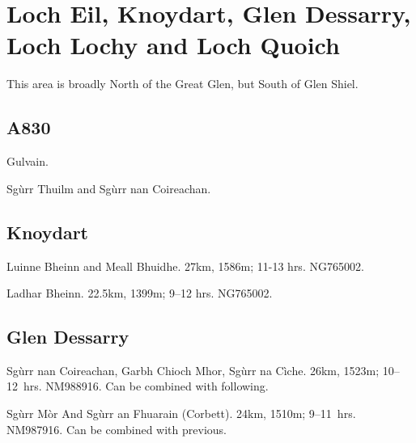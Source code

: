 \section{Loch Eil, Knoydart, Glen Dessarry, Loch Lochy and Loch Quoich}

This area is broadly North of the Great Glen, but South of Glen Shiel. 

\subsection{A830}

\begin{munros}
\item
Gulvain.  \tick

\item
Sgùrr Thuilm and Sgùrr nan Coireachan.  \tick
\end{munros}


\subsection{Knoydart}

\begin{munros}
\item
\target Luinne Bheinn and Meall Bhuidhe.   27km, 1586m; 11-13 hrs.
NG765002.  \tick

\item
\target  Ladhar Bheinn.  22.5km, 1399m; 9--12 hrs.  NG765002.  \tick
\end{munros}


\subsection{Glen Dessarry}

\begin{munros}
\item
\target Sgùrr nan Coireachan, Garbh Chioch Mhor, Sgùrr na Cìche.  26km, 1523m;
10--12~hrs.  NM988916.  Can be combined with following.  \tick

\item
\target Sgùrr Mòr And Sgùrr an Fhuarain (Corbett).  24km, 1510m;
9--11~hrs. NM987916.  Can be combined with previous.  \tick
\end{munros}



